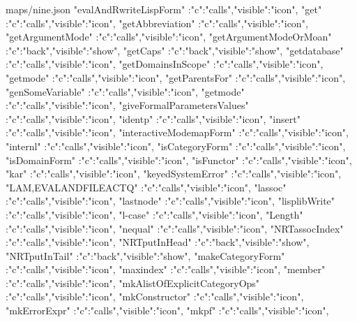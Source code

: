 \documentclass{article}
\begin{document}
\begin{chunk}{maps/nine.json}
{{  "evalAndRwriteLispForm"          :{"c":"calls","visible":"icon"},
  "get"                            :{"c":"calls","visible":"icon"},
  "getAbbreviation"                :{"c":"calls","visible":"icon"},
  "getArgumentMode"                :{"c":"calls","visible":"icon"},
  "getArgumentModeOrMoan"          :{"c":"back","visible":"show"},
  "getCaps"                        :{"c":"back","visible":"show"},
  "getdatabase"                    :{"c":"calls","visible":"icon"},
  "getDomainsInScope"              :{"c":"calls","visible":"icon"},
  "getmode"                        :{"c":"calls","visible":"icon"},
  "getParentsFor"                  :{"c":"calls","visible":"icon"},
  "genSomeVariable"                :{"c":"calls","visible":"icon"},
  "getmode"                        :{"c":"calls","visible":"icon"},
  "giveFormalParametersValues"     :{"c":"calls","visible":"icon"},
  "identp"                         :{"c":"calls","visible":"icon"},
  "insert"                         :{"c":"calls","visible":"icon"},
  "interactiveModemapForm"         :{"c":"calls","visible":"icon"},
  "internl"                        :{"c":"calls","visible":"icon"},
  "isCategoryForm"                 :{"c":"calls","visible":"icon"},
  "isDomainForm"                   :{"c":"calls","visible":"icon"},
  "isFunctor"                      :{"c":"calls","visible":"icon"},
  "kar"                            :{"c":"calls","visible":"icon"},
  "keyedSystemError"               :{"c":"calls","visible":"icon"},
  "LAM,EVALANDFILEACTQ"            :{"c":"calls","visible":"icon"},
  "lassoc"                         :{"c":"calls","visible":"icon"},
  "lastnode"                       :{"c":"calls","visible":"icon"},
  "lisplibWrite"                   :{"c":"calls","visible":"icon"},
  "l-case"                         :{"c":"calls","visible":"icon"},
  "Length"                         :{"c":"calls","visible":"icon"},
  "nequal"                         :{"c":"calls","visible":"icon"},
  "NRTassocIndex"                  :{"c":"calls","visible":"icon"},
  "NRTputInHead"                   :{"c":"back","visible":"show"},
  "NRTputInTail"                   :{"c":"back","visible":"show"},
  "makeCategoryForm"               :{"c":"calls","visible":"icon"},
  "maxindex"                       :{"c":"calls","visible":"icon"},
  "member"                         :{"c":"calls","visible":"icon"},
  "mkAlistOfExplicitCategoryOps"   :{"c":"calls","visible":"icon"},
  "mkConstructor"                  :{"c":"calls","visible":"icon"},
  "mkErrorExpr"                    :{"c":"calls","visible":"icon"},
  "mkpf"                           :{"c":"calls","visible":"icon"},
}}
\end{chunk}
\end{document}
